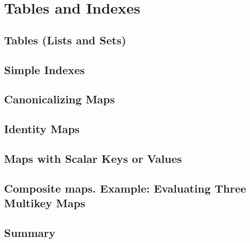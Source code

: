 \chapter{Tables and Indexes}
\label{chapter:tables-indexes}


\section{Tables (Lists and Sets)}

\section{Simple Indexes}

\section{Canonicalizing Maps}

\section{Identity Maps}

\section{Maps with Scalar Keys or Values}

\section{Composite maps. Example: Evaluating Three
Multikey Maps}


\section{Summary}

